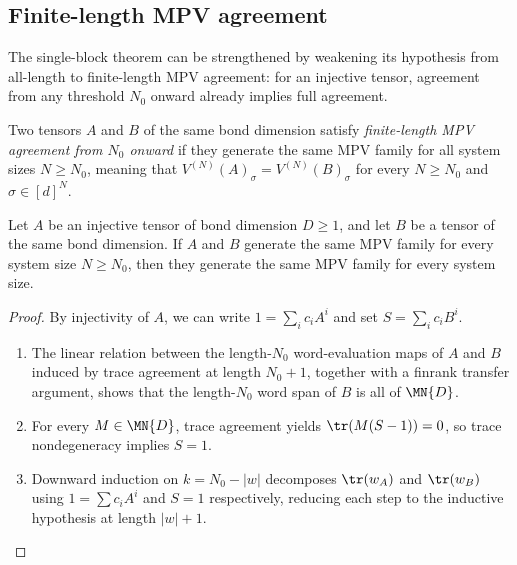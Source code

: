 \subsection{Finite-length MPV agreement}

The single-block theorem can be strengthened by weakening its hypothesis from
all-length to finite-length MPV agreement: for an injective tensor,
agreement from any threshold $N_0$ onward already implies full agreement.

\begin{definition}\label{def:same_mpv_from}
    \leanok
    Two tensors $A$ and $B$ of the same bond dimension satisfy
    \emph{finite-length MPV agreement from $N_0$ onward} if they generate
    the same MPV family for all system sizes $N \ge N_0$, meaning that
    $V^{(N)}(A)_\sigma = V^{(N)}(B)_\sigma$ for every $N \ge N_0$ and
    $\sigma \in [d]^N$.
\end{definition}

\begin{lemma}%
    \label{thm:sameMPV_of_sameMPVFrom}
    \leanok
    Let $A$ be an injective tensor of bond dimension $D \ge 1$, and let
    $B$ be a tensor of the same bond dimension. If $A$ and $B$ generate
    the same MPV family for every system size $N \ge N_0$, then they
    generate the same MPV family for every system size.
\end{lemma}

\begin{proof}
    \leanok
    By injectivity of $A$, we can write $1 = \sum_i c_i A^i$ and set
    $S = \sum_i c_i B^i$.
    \begin{enumerate}
        \item The linear relation between the
              length-$N_0$ word-evaluation maps of $A$ and $B$
              induced by trace agreement at length $N_0 + 1$,
              together with a finrank transfer argument, shows that the length-$N_0$ word span of $B$ is all of
              $\MN{D}$.
        \item For every $M \in \MN{D}$, trace agreement yields $\tr(M(S - 1)) = 0$, so trace nondegeneracy implies $S = 1$.
        \item Downward induction on $k = N_0 - |w|$ decomposes
              $\tr(w_A)$ and $\tr(w_B)$ using $1 = \sum c_i A^i$
              and $S = 1$ respectively, reducing each step to the inductive
              hypothesis at length $|w| + 1$.
    \end{enumerate}
\end{proof}

